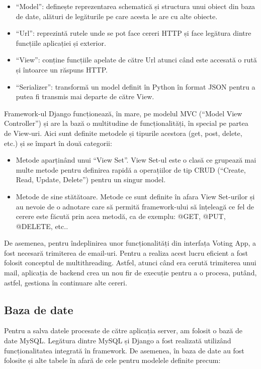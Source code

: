 \begin{itemize}
    \item \enquote{Model}: definește reprezentarea schematică și structura unui obiect din baza de date, alături de legăturile pe care acesta le are cu alte obiecte.
    \item \enquote{Url}: reprezintă rutele unde se pot face cereri HTTP și face legătura dintre funcțiile aplicației și exterior.
    \item \enquote{View}: conține funcțiile apelate de către Url atunci când este accesată o rută și întoarce un răspuns HTTP.
    \item \enquote{Serializer}: transformă un model definit în Python în format JSON pentru a putea fi transmis mai departe de către View.
\end{itemize}

Framework-ul Django funcționează, în mare, pe modelul MVC (\enquote{Model View Controller}) \cite{MVC_what_is} și are la bază o multitudine de funcționalități, în special pe partea de View-uri. Aici sunt definite metodele și tipurile acestora (get, post, delete, etc.) și se împart în două categorii:

\begin{itemize}
    \item Metode aparținând unui \enquote{View Set}. View Set-ul este o clasă ce grupează mai multe metode pentru definirea rapidă a operațiilor de tip CRUD (\enquote{Create, Read, Update, Delete}) pentru un singur model.
    \item Metode de sine stătătoare. Metode ce sunt definite în afara View Set-urilor și au nevoie de o adnotare care să permită framework-ului să înțeleagă ce fel de cerere este făcută prin acea metodă, ca de exemplu: @GET, @PUT, @DELETE, etc..
\end{itemize}

De asemenea, pentru îndeplinirea unor funcționalități din interfața Voting App, a fost necesară trimiterea de email-uri. Pentru a realiza acest lucru eficient a fost folosit conceptul de multithreading. Astfel, atunci când era cerută trimiterea unui mail, aplicația de backend crea un nou fir de execuție pentru a o procesa, putând, astfel, gestiona în continuare alte cereri.

\subsection{Baza de date}

Pentru a salva datele procesate de către aplicația server, am folosit o bază de date MySQL. Legătura dintre MySQL și Django a fost realizată utilizând funcționalitatea integrată în framework. De asemenea, în baza de date au fost folosite și alte tabele în afară de cele pentru modelele definite precum:

